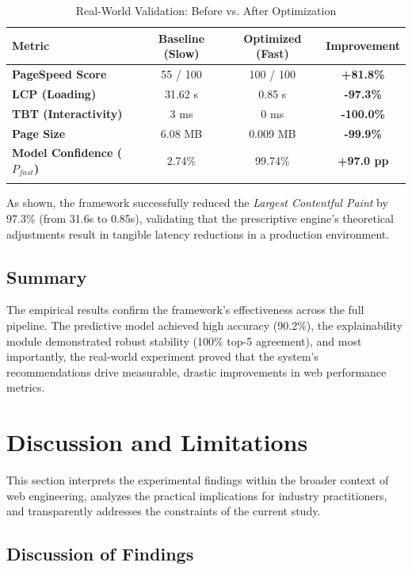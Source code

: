 \documentclass[sn-nature]{sn-jnl}
\begin{document}
\begin{table}[h]
\caption{Real-World Validation: Before vs. After Optimization}\label{tab:real_world_results}
\centering
\begin{tabular}{l c c c}
\toprule
Metric & Baseline (Slow) & Optimized (Fast) & Improvement \\
\midrule
\textbf{PageSpeed Score} & 55 / 100 & 100 / 100 & \textbf{+81.8\%} \\
\textbf{LCP (Loading)} & 31.62 s & 0.85 s & \textbf{-97.3\%} \\
\textbf{TBT (Interactivity)} & 3 ms & 0 ms & \textbf{-100.0\%} \\
\textbf{Page Size} & 6.08 MB & 0.009 MB & \textbf{-99.9\%} \\
\textbf{Model Confidence ($P_{fast}$)} & 2.74\% & 99.74\% & \textbf{+97.0 pp} \\
\botrule
\end{tabular}
\end{table}

As shown, the framework successfully reduced the \textit{Largest Contentful Paint} by 97.3\% (from 31.6s to 0.85s), validating that the prescriptive engine's theoretical adjustments result in tangible latency reductions in a production environment.

\subsection{Summary}

The empirical results confirm the framework's effectiveness across the full pipeline. The predictive model achieved high accuracy (90.2\%), the explainability module demonstrated robust stability (100\% top-5 agreement), and most importantly, the real-world experiment proved that the system's recommendations drive measurable, drastic improvements in web performance metrics.


\section{Discussion and Limitations}\label{sec7}

This section interprets the experimental findings within the broader context of web engineering, analyzes the practical implications for industry practitioners, and transparently addresses the constraints of the current study.

\subsection{Discussion of Findings}
\end{document}

